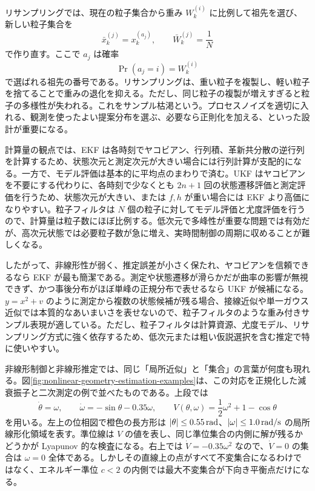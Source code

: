 リサンプリングでは、現在の粒子集合から重み $W_k^{(i)}$ に比例して祖先を選び、新しい粒子集合を
\begin{equation}
  \bar{x}_k^{(j)}=x_k^{(a_j)},\qquad
  \bar{W}_k^{(j)}=\frac{1}{N}
\end{equation}
で作り直す。ここで $a_j$ は確率
\begin{equation}
  \Pr(a_j=i)=W_k^{(i)}
\end{equation}
で選ばれる祖先の番号である。リサンプリングは、重い粒子を複製し、軽い粒子を捨てることで重みの退化を抑える。ただし、同じ粒子の複製が増えすぎると粒子の多様性が失われる。これをサンプル枯渇という。プロセスノイズを適切に入れる、観測を使ったよい提案分布を選ぶ、必要なら正則化を加える、といった設計が重要になる。

計算量の観点では、EKF は各時刻でヤコビアン、行列積、革新共分散の逆行列を計算するため、状態次元と測定次元が大きい場合には行列計算が支配的になる。一方で、モデル評価は基本的に平均点のまわりで済む。UKF はヤコビアンを不要にする代わりに、各時刻で少なくとも $2n+1$ 回の状態遷移評価と測定評価を行うため、状態次元が大きい、または $f,h$ が重い場合には EKF より高価になりやすい。粒子フィルタは $N$ 個の粒子に対してモデル評価と尤度評価を行うので、計算量は粒子数にほぼ比例する。低次元で多峰性が重要な問題では有効だが、高次元状態では必要粒子数が急に増え、実時間制御の周期に収めることが難しくなる。

したがって、非線形性が弱く、推定誤差が小さく保たれ、ヤコビアンを信頼できるなら EKF が最も簡潔である。測定や状態遷移が滑らかだが曲率の影響が無視できず、かつ事後分布がほぼ単峰の正規分布で表せるなら UKF が候補になる。$y=x^2+v$ のように測定から複数の状態候補が残る場合、接線近似や単一ガウス近似では本質的なあいまいさを表せないので、粒子フィルタのような重み付きサンプル表現が適している。ただし、粒子フィルタは計算資源、尤度モデル、リサンプリング方式に強く依存するため、低次元または粗い仮説選択を含む推定で特に使いやすい。

非線形制御と非線形推定では、同じ「局所近似」と「集合」の言葉が何度も現れる。図\ref{fig:nonlinear-geometry-estimation-examples}は、この対応を正規化した減衰振子と二次測定の例で並べたものである。上段では
\begin{equation}
  \dot{\theta}=\omega,\qquad
  \dot{\omega}=-\sin\theta-0.35\omega,\qquad
  V(\theta,\omega)=\frac{1}{2}\omega^2+1-\cos\theta
\end{equation}
を用いる。左上の位相図で橙色の長方形は $\left|\theta\right|\le0.55\,\mathrm{rad}$、$\left|\omega\right|\le1.0\,\mathrm{rad/s}$ の局所線形化領域を表す。準位線は $V$ の値を表し、同じ準位集合の内側に解が残るかどうかが Lyapunov 的な検査になる。右上では $\dot{V}=-0.35\omega^2$ なので、$\dot{V}=0$ の集合は $\omega=0$ 全体である。しかしその直線上の点がすべて不変集合になるわけではなく、エネルギー準位 $c<2$ の内側では最大不変集合が下向き平衡点だけになる。

